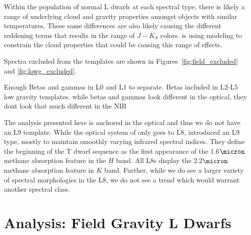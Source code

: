 \documentclass[12pt,preprint]{aastex}
\begin{document}
Within the population of normal L dwarfs at each spectral type, there is likely a range of underlying cloud and gravity properties amongst objects with similar temperatures.
These same differences are also likely causing the different reddening terms that results in the range of $J-K_S$ colors. \citet[in prep.]{Hiranaka13} is using modeling to constrain the cloud properties that could be causing this range of effects.

Spectra excluded from the templates are shown in Figures~\ref{fig:field_excluded} and \ref{fig:lowg_excluded}.

Enough Betas and gammas in L0 and L1 to separate.
Betas included in L2-L5 low gravity templates.
while betas and gammas look different in the optical, they dont look that much different in the NIR

The analysis presented here is anchored in the optical and thus we do not have an L9 template.
While the optical system of \cite{K99} only goes to L8, \cite{Geballe02} introduced an L9 type, mostly to maintain smoothly varying infrared spectral indices.
They define the beginning of the T dwarf sequence as the first appearance of the 1.6$\micron$ methane absorption feature in the $H$ band.
All L8s display the 2.2$\micron$ methane absorption feature in $K$ band.
Further, while we do see a larger variety of spectral morphologies in the L8, we do not see a trend which would warrant another spectral class.



\clearpage
\section{Analysis: Field Gravity L Dwarfs}
\label{sec:fieldg}
\end{document}
